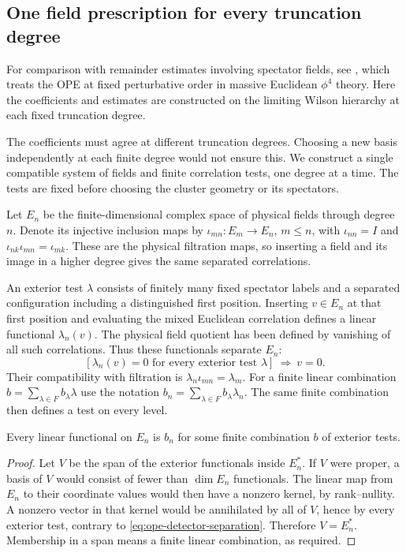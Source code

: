 \subsection{One field prescription for every truncation degree}
\label{sec:ope-prescription}

For comparison with remainder estimates involving spectator fields,
see \cite[\S1]{HollandsKopper}, which treats the OPE at fixed perturbative
order in massive Euclidean $\phi^4$ theory. Here the coefficients and
estimates are constructed on the limiting Wilson hierarchy at each
fixed truncation degree.

The coefficients must agree at different truncation degrees. Choosing a new basis independently at each
finite degree would not ensure this. We construct a single compatible
system of fields and finite correlation tests, one degree at a time.
The tests are fixed before choosing the cluster geometry or its spectators.

Let $E_n$ be the finite-dimensional complex space of physical fields through
degree $n$. Denote its injective inclusion maps by
$\iota_{mn}:E_m\to E_n$, $m\leq n$, with
$\iota_{nn}=I$ and $\iota_{nk}\iota_{mn}=\iota_{mk}$.
These are the physical filtration maps, so inserting a field and its image
in a higher degree gives the same separated correlations.

An exterior test $\lambda$ consists of finitely many fixed spectator labels
and a separated configuration including a distinguished first position.
Inserting $v\in E_n$ at that first position and evaluating the mixed
Euclidean correlation defines a linear functional $\lambda_n(v)$.
The physical field quotient has been defined by vanishing of all such
correlations. Thus these functionals separate $E_n$:
\begin{equation}\label{eq:ope-detector-separation}
 [\lambda_n(v)=0\text{ for every exterior test }\lambda]\ \Longrightarrow\ v=0.
\end{equation}
Their compatibility with filtration is
$\lambda_n\iota_{mn}=\lambda_m$. For a finite linear combination
$b=\sum_{\lambda\in F}b_\lambda\lambda$ use the notation
$b_n=\sum_{\lambda\in F}b_\lambda\lambda_n$. The same finite combination
then defines a test on every level.

\begin{lemma}\label{lem:ope-detector-span}
Every linear functional on $E_n$ is $b_n$ for some finite combination $b$
of exterior tests.
\end{lemma}
\begin{proof}
Let $V$ be the span of the exterior functionals inside $E_n^*$.
If $V$ were proper, a basis of $V$ would consist of fewer than $\dim E_n$
functionals. The linear map from $E_n$ to their coordinate values would
then have a nonzero kernel, by rank--nullity. A nonzero vector in that
kernel would be annihilated by all of $V$, hence by every exterior test,
contrary to \eqref{eq:ope-detector-separation}. Therefore $V=E_n^*$.
Membership in a span means a finite linear combination, as required.
\end{proof}


